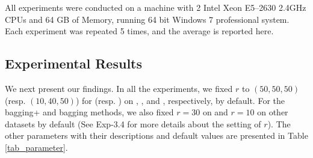 All experiments were conducted on a machine with 2 Intel Xeon
E5--2630 2.4GHz CPUs and 64 GB of Memory, running 64 bit
Windows 7 professional system. Each experiment was repeated 5 times,
and the average is reported here.

\subsection{Experimental Results}


We next present our findings. In all the experiments, we fixed $r$ to
$(50, 50, 50)$ (resp. $(10, 40, 50)$) for \NMF (resp. \BIGCLAM) on
\Digg, \YouTube, and \Wikipedia, respectively, by default. For the bagging+ and bagging
methods, we also fixed $r = 30$ on \Digg and $r = 10$ on other datasets by default
(See Exp-3.4 for more details about the setting of $r$).
The other parameters with their descriptions and default values
are presented in Table \ref{tab_parameter}.

